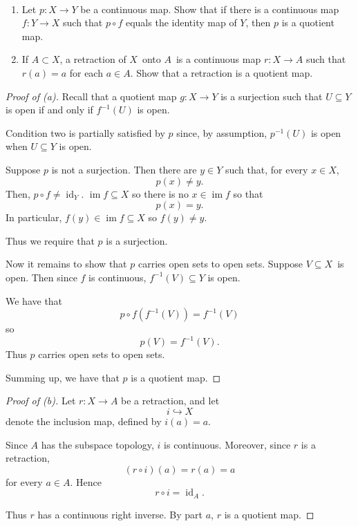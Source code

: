 \documentclass[11pt]{article}
\begin{document}
\begin{prob}
    \medskip 
    \ 

    \begin{enumerate}[label=\alph*)]
        \item Let $p : X \to Y$ be a continuous map. 
            Show that if there is a continuous map 
            $f : Y \to X$ such that $p \circ f$ equals
            the identity map of $Y$, then $p$ is a quotient map. 
        \item If $A \subset X$, a retraction of 
            $X$ onto $A$ is a continuous map $r : X \to A$
            such that $r(a) = a$ for each $a \in A$. Show 
            that a retraction is a quotient map. 
    \end{enumerate}
\end{prob}
\begin{proof}[Proof of (a)]
    Recall that a quotient map $g : X \to Y$ is a 
    surjection such that $U \subseteq Y$ 
    is open if and only if $f^{-1}(U)$ is open. 

    Condition two is partially satisfied 
    by $p$ since, by assumption, 
    $p^{-1}(U)$ is open when $U \subseteq Y$ is open. 

    Suppose $p$ is not a surjection. 
    Then there are $y \in Y$ such that, 
    for every $x \in X$, 
    \[
        p(x) \neq y. 
    \]
    Then, $p \circ f \neq \operatorname{id}_Y$. 
    $\operatorname{im} f \subseteq X$ so there is 
    no $x \in \operatorname{im} f$ so that
    \[
        p(x) = y. 
    \]
    In particular, 
    $f(y) \in \operatorname{im} f \subseteq X$ so 
    $f(y) \neq y$. 

    Thus we require that $p$ is a surjection. 

    Now it remains to show that $p$ carries 
    open sets to open sets. 
    Suppose $V \subseteq X$ is open. 
    Then since $f$ is continuous, 
    $f^{-1}(V) \subseteq Y$ is open. 

    We have that 
    \[
        p\circ f(f^{-1}(V)) = f^{-1}(V)
    \]
    so 
    \[
        p(V) = f^{-1}(V). 
    \]
    Thus $p$ carries open sets to open sets. 

    Summing up, we have that $p$ is 
    a quotient map. 
\end{proof}
\begin{proof}[Proof of (b)]

Let $r: X \to A$ be a retraction, and let
\[
    i\hookrightarrow X
\]
denote the inclusion map, defined by $i(a)=a$.

Since $A$ has the subspace topology, $i$ is continuous. Moreover, since $r$ is a retraction,
\[
    (r\circ i)(a)=r(a)=a
\]
for every $a\in A$. Hence
\[
    r\circ i=\operatorname{id}_A.
\]

Thus $r$ has a continuous right inverse. By part $a$, $r$ is a quotient map.
\end{proof}
\end{document}
